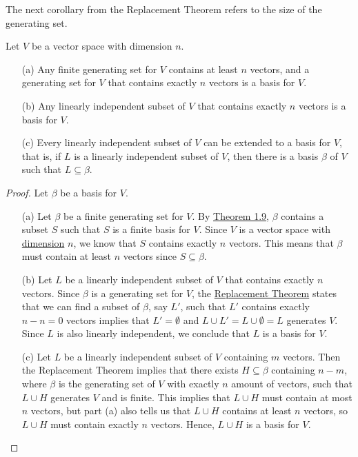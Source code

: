 The next corollary from the Replacement Theorem refers to the size of the generating set.

\begin{corollary}\label{2nd Corollary to RT}
    Let \( V  \) be a vector space with dimension \( n \).
    \begin{enumerate}
        \item[(a)] Any finite generating set for \( V  \) contains at least \( n  \) vectors, and a generating set for \( V  \) that contains exactly \( n \) vectors is a basis for \( V  \).
        \item[(b)] Any linearly independent subset of \( V  \) that contains exactly \( n  \) vectors is a basis for \( V  \).
        \item[(c)] Every linearly independent subset of \( V  \) can be extended to a basis for \( V  \), that is, if \( L \) is a linearly independent subset of \( V  \), then there is a basis \( \beta \) of \( V  \) such that \( L \subseteq \beta \).   
    \end{enumerate}
\end{corollary}
\begin{proof}
    Let \( \beta  \) be a basis for \( V  \).
\begin{enumerate}
    \item[(a)] Let \( \beta  \) be a finite generating set for \( V  \). By {\hyperref[Theorem 1.9]{Theorem 1.9}}, \( \beta  \) contains a subset \( S \) such that \( S \) is a finite basis for \( V  \). Since \( V  \) is a vector space with {\hyperref[Dimension]{dimension}} \( n \), we know that \( S \) contains exactly \( n  \) vectors. This means that \( \beta  \) must contain at least \( n  \) vectors since \( S  \subseteq \beta  \). 
    \item[(b)] Let \( L \) be a linearly independent subset of \( V  \) that contains exactly \( n  \) vectors. Since \( \beta  \) is a generating set for \( V  \), the {\hyperref[Replacement Theorem]{Replacement Theorem}} states that we can find a subset of \( \beta \), say \( L' \), such that \( L' \) contains exactly \( n - n = 0   \) vectors implies that \( L' = \emptyset \) and \( L \cup L' = L \cup \emptyset = L  \) generates \( V  \). Since \( L  \) is also linearly independent, we conclude that \( L  \) is a basis for \( V  \). 
    \item[(c)] Let \( L  \) be a linearly independent subset of \( V  \) containing \( m  \) vectors. Then the Replacement Theorem implies that there exists \( H \subseteq \beta  \) containing \( n - m  \), where \( \beta  \) is the generating set of \( V  \) with exactly \( n  \) amount of vectors, such that \( L \cup H    \) generates \( V  \) and is finite. This implies that \( L \cup H  \) must contain at most \( n  \) vectors, but part (a) also tells us that \( L \cup H  \) contains at least \(  n \) vectors, so \( L \cup H  \) must contain exactly \( n \) vectors. Hence, \( L \cup H  \) is a basis for \( V  \). 
\end{enumerate}
\end{proof}


